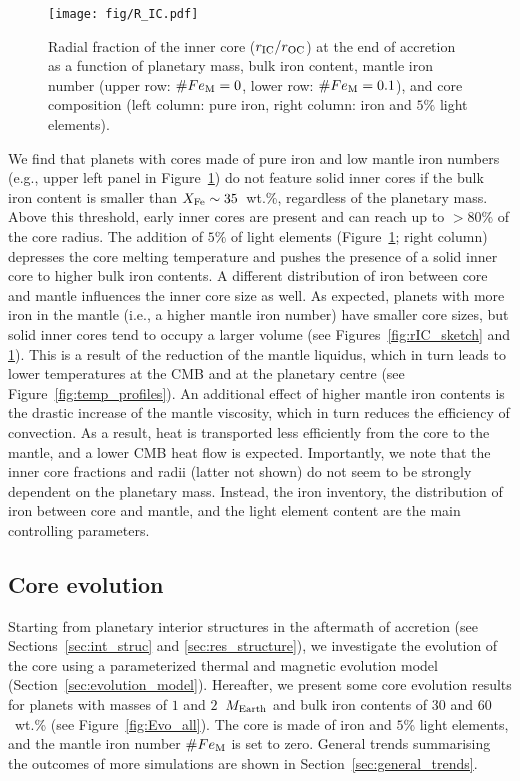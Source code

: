 \documentclass[draft]{agujournal2019} %
\begin{document}
\begin{figure}[t]
\texttt{[image: fig/R\_IC.pdf]}
\caption{Radial fraction of the inner core ($r_{\rm IC}/r_{\rm OC}$) at the end of accretion as a function of planetary mass, bulk iron content, mantle iron number (upper row: $\# Fe_{\rm M}=0$, lower row: $\# Fe_{\rm M}=0.1$), and core composition (left column: pure iron, right column: iron and $5\%$ light elements).}
\label{fig:rIC}
\end{figure}

We find that planets with cores made of pure iron and low mantle iron numbers (e.g., upper left panel in Figure~\ref{fig:rIC}) do not feature solid inner cores if the bulk iron content is smaller than $X_{\rm Fe}\sim 35$~wt.\%, regardless of the planetary mass. Above this threshold, early inner cores are present and can reach up to $>80\%$ of the core radius. The addition of $5\%$ of light elements (Figure~\ref{fig:rIC}; right column) depresses the core melting temperature and pushes the presence of a solid inner core to higher bulk iron contents. A different distribution of iron between core and mantle influences the inner core size as well. As expected, planets with more iron in the mantle (i.e., a higher mantle iron number) have smaller core sizes, but solid inner cores tend to occupy a larger volume (see Figures~\ref{fig:rIC_sketch} and \ref{fig:rIC}). This is a result of the reduction of the mantle liquidus, which in turn leads to lower temperatures at the CMB and at the planetary centre (see Figure~\ref{fig:temp_profiles}). An additional effect of higher mantle iron contents is the drastic increase of the mantle viscosity, which in turn reduces the efficiency of convection. As a result, heat is transported less efficiently from the core to the mantle, and a lower CMB heat flow is expected.
Importantly, we note that the inner core fractions and radii (latter not shown) do not seem to be strongly dependent on the planetary mass. Instead, the iron inventory, the distribution of iron between core and mantle, and the light element content are the main controlling parameters.

\subsection{Core evolution}\label{sec:res_evolution}

Starting from planetary interior structures in the aftermath of accretion (see Sections~\ref{sec:int_struc} and \ref{sec:res_structure}), we investigate the evolution of the core using a parameterized thermal and magnetic evolution model (Section~\ref{sec:evolution_model}). Hereafter, we present some core evolution results for planets with masses of $1$ and $2$~$M_{\rm Earth}$ and bulk iron contents of $30$ and $60$~wt.\% (see Figure~\ref{fig:Evo_all}). The core is made of iron and $5$\% light elements, and the mantle iron number $\#Fe_{\rm M}$ is set to zero.
General trends summarising the outcomes of more simulations are shown in Section~\ref{sec:general_trends}.
\end{document}
